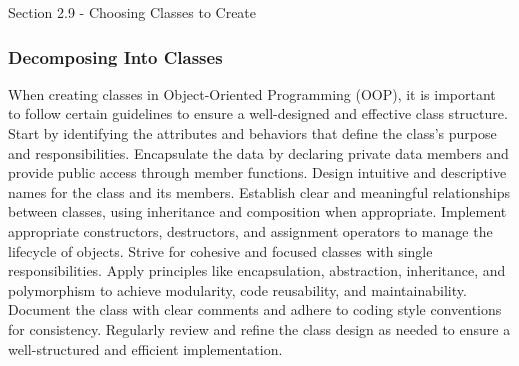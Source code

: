 \begin{notes}{Section 2.9 - Choosing Classes to Create}
    \subsubsection*{Decomposing Into Classes}

    When creating classes in Object-Oriented Programming (OOP), it is important to follow certain guidelines to ensure a well-designed and effective class structure. Start by identifying the attributes and behaviors that define the class's purpose and 
    responsibilities. Encapsulate the data by declaring private data members and provide public access through member functions. Design intuitive and descriptive names for the class and its members. Establish clear and meaningful relationships between 
    classes, using inheritance and composition when appropriate. Implement appropriate constructors, destructors, and assignment operators to manage the lifecycle of objects. Strive for cohesive and focused classes with single responsibilities. Apply 
    principles like encapsulation, abstraction, inheritance, and polymorphism to achieve modularity, code reusability, and maintainability. Document the class with clear comments and adhere to coding style conventions for consistency. Regularly review 
    and refine the class design as needed to ensure a well-structured and efficient implementation.
\end{notes}

